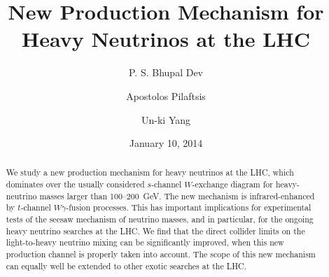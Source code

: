 \documentclass[reprint,prl,twocolumn,superscriptaddress,showpacs,nofootinbib,floatfix,preprintnumbers]{revtex4-1}
\begin{document}
\title {\bf \Large New Production Mechanism for Heavy Neutrinos at the LHC} 
\author {P. S. Bhupal Dev}
\author{Apostolos Pilaftsis} 
\author{Un-ki Yang} 
\vspace{1cm}

\begin{abstract}
We study  a new production mechanism  for heavy neutrinos  at the LHC,
which dominates  over the usually  considered $s$-channel $W$-exchange
diagram for  heavy-neutrino masses larger than  100--200~GeV.  The new
mechanism   is  infrared-enhanced   by   $t$-channel  $W\gamma$-fusion
processes. This  has important implications for  experimental tests of
the seesaw  mechanism of neutrino  masses, and in particular, for the
ongoing heavy neutrino searches at the LHC.  We find that
the direct  collider limits on the light-to-heavy  neutrino mixing can
be significantly improved, when this new production
channel  is  properly taken  into  account.   The  scope of  this  new
mechanism can equally well be extended to other exotic searches at the
LHC.
\end{abstract}

\date{January 10, 2014}

\maketitle
\end{document}
